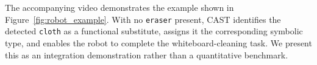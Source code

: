 The accompanying video demonstrates the example shown in Figure~\ref{fig:robot_example}. With no \texttt{eraser} present, CAST identifies the detected \texttt{cloth} as a functional substitute, assigns it the corresponding symbolic type, and enables the robot to complete the whiteboard-cleaning task. We present this as an integration demonstration rather than a quantitative benchmark.

